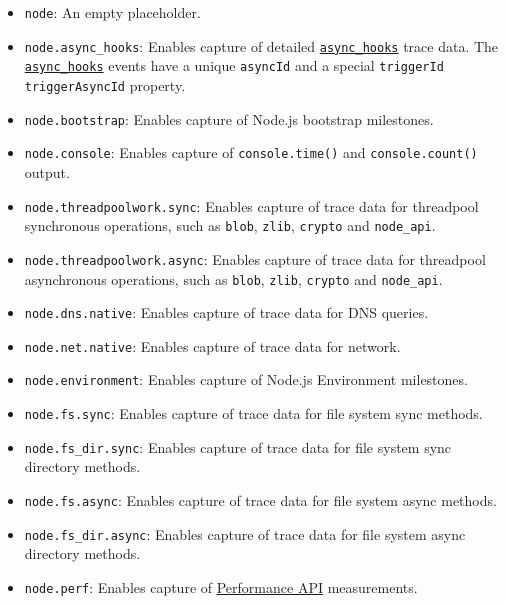 \begin{itemize}
\tightlist
\item
  \texttt{node}: An empty placeholder.
\item
  \texttt{node.async\_hooks}: Enables capture of detailed
  \href{async_hooks.md}{\texttt{async\_hooks}} trace data. The
  \href{async_hooks.md}{\texttt{async\_hooks}} events have a unique
  \texttt{asyncId} and a special \texttt{triggerId}
  \texttt{triggerAsyncId} property.
\item
  \texttt{node.bootstrap}: Enables capture of Node.js bootstrap
  milestones.
\item
  \texttt{node.console}: Enables capture of \texttt{console.time()} and
  \texttt{console.count()} output.
\item
  \texttt{node.threadpoolwork.sync}: Enables capture of trace data for
  threadpool synchronous operations, such as \texttt{blob},
  \texttt{zlib}, \texttt{crypto} and \texttt{node\_api}.
\item
  \texttt{node.threadpoolwork.async}: Enables capture of trace data for
  threadpool asynchronous operations, such as \texttt{blob},
  \texttt{zlib}, \texttt{crypto} and \texttt{node\_api}.
\item
  \texttt{node.dns.native}: Enables capture of trace data for DNS
  queries.
\item
  \texttt{node.net.native}: Enables capture of trace data for network.
\item
  \texttt{node.environment}: Enables capture of Node.js Environment
  milestones.
\item
  \texttt{node.fs.sync}: Enables capture of trace data for file system
  sync methods.
\item
  \texttt{node.fs\_dir.sync}: Enables capture of trace data for file
  system sync directory methods.
\item
  \texttt{node.fs.async}: Enables capture of trace data for file system
  async methods.
\item
  \texttt{node.fs\_dir.async}: Enables capture of trace data for file
  system async directory methods.
\item
  \texttt{node.perf}: Enables capture of
  \href{perf_hooks.md}{Performance API} measurements.


\end{itemize}
